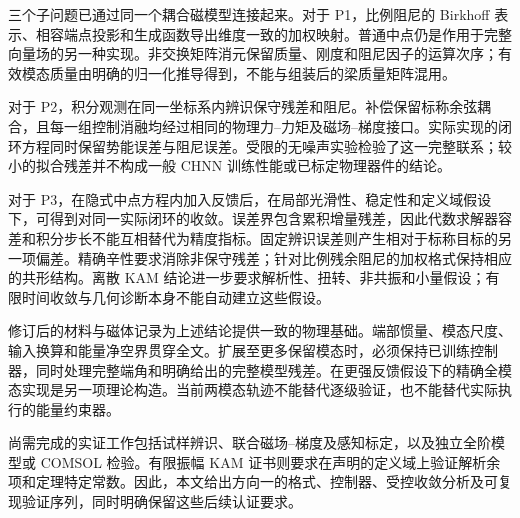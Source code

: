 三个子问题已通过同一个耦合磁模型连接起来。对于 P1，比例阻尼的 Birkhoff 表示、相容端点投影和生成函数导出维度一致的加权映射。普通中点仍是作用于完整向量场的另一种实现。非交换矩阵消元保留质量、刚度和阻尼因子的运算次序；有效模态质量由明确的归一化推导得到，不能与组装后的梁质量矩阵混用。

对于 P2，积分观测在同一坐标系内辨识保守残差和阻尼。补偿保留标称余弦耦合，且每一组控制消融均经过相同的物理力--力矩及磁场--梯度接口。实际实现的闭环方程同时保留势能误差与阻尼误差。受限的无噪声实验检验了这一完整联系；较小的拟合残差并不构成一般 CHNN 训练性能或已标定物理器件的结论。

对于 P3，在隐式中点方程内加入反馈后，在局部光滑性、稳定性和定义域假设下，可得到对同一实际闭环的收敛。误差界包含累积增量残差，因此代数求解器容差和积分步长不能互相替代为精度指标。固定辨识误差则产生相对于标称目标的另一项偏差。精确辛性要求消除非保守残差；针对比例残余阻尼的加权格式保持相应的共形结构。离散 KAM 结论进一步要求解析性、扭转、非共振和小量假设；有限时间收敛与几何诊断本身不能自动建立这些假设。

修订后的材料与磁体记录为上述结论提供一致的物理基础。端部惯量、模态尺度、输入换算和能量净空界贯穿全文。扩展至更多保留模态时，必须保持已训练控制器，同时处理完整端角和明确给出的完整模型残差。在更强反馈假设下的精确全模态实现是另一项理论构造。当前两模态轨迹不能替代逐级验证，也不能替代实际执行的能量约束器。

尚需完成的实证工作包括试样辨识、联合磁场--梯度及感知标定，以及独立全阶模型或 COMSOL 检验。有限振幅 KAM 证书则要求在声明的定义域上验证解析余项和定理特定常数。因此，本文给出方向一的格式、控制器、受控收敛分析及可复现验证序列，同时明确保留这些后续认证要求。
